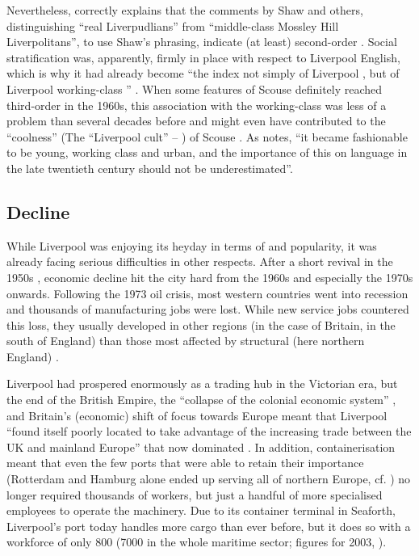 Nevertheless, \citeauthor{crowley2012} correctly explains that the comments by Shaw and others, distinguishing ``real Liverpudlians'' from ``middle-class Mossley Hill Liverpolitans'', to use Shaw's phrasing, indicate (at least) second-order . Social stratification was, apparently, firmly in place with respect to Liverpool English, which is why it had already become ``the index not simply of Liverpool , but of Liverpool working-class '' \citep[107]{crowley2012}.
When some features of Scouse definitely reached third-order  in the 1960s, this association with the working-class was less of a problem than several decades before and might even have contributed to the ``coolness'' (The ``Liverpool cult'' -- \citealt[109]{crowley2012}) of Scouse .
As \citet[165]{wales2006} notes, ``it became fashionable to be young, working class and urban, and the importance of this on language  in the late twentieth century should not be underestimated''.

		\subsection{Decline}\label{sec.hist.20.decline}
\largerpage[-1]
While Liverpool was enjoying its heyday in terms of  and popularity, it was already facing serious difficulties in other respects. After a short revival in the 1950s \citep[cf.][402]{murden2006}, economic decline hit the city hard from the 1960s and especially the 1970s onwards.
Following the 1973 oil crisis, most western countries went into recession and thousands of manufacturing jobs were lost.
While new service jobs countered this loss, they usually developed in other regions (in the case of Britain, in the south of England) than those most affected by structural  (here northern England) \citep[cf.][16--17]{juddparkinson1990a}.

Liverpool had prospered enormously as a trading hub in the Victorian era, but the end of the British Empire, the ``collapse of the colonial economic system'' \citep[52]{belchem2006a}, and Britain's (economic) shift of focus towards Europe meant that Liverpool ``found itself poorly located to take advantage of the increasing trade between the UK and mainland Europe'' that now dominated \citep[166--167]{couch2003a}.
In addition, containerisation meant that even the few ports that were able to retain their importance (Rotterdam and Hamburg alone ended up serving all of northern Europe, cf. \citealt[264]{milne2006}) no longer required thousands of workers, but just a handful of more specialised employees to operate the machinery.
Due to its container terminal in Seaforth, Liverpool's port today handles more cargo than ever before, but it does so with a workforce of only 800 (7000 in the whole maritime sector; figures for 2003, \citealt[cf.][477]{murden2006}).

